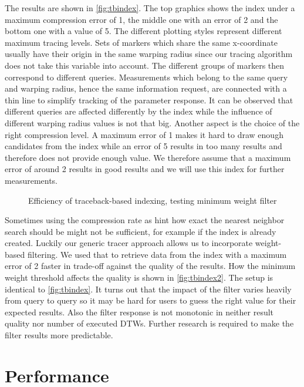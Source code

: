 The results are shown in \autoref{fig:tbindex}. The top graphics shows the index under a maximum compression error of \num{1}, the middle one with an error of \num{2} and the bottom one with a value of \num{5}. The different plotting styles represent different maximum tracing levels. Sets of markers which share the same x-coordinate usually have their origin in the same warping radius since our tracing algorithm does not take this variable into account. The different groups of markers then correspond to different queries. Measurements which belong to the same query and warping radius, hence the same information request, are connected with a thin line to simplify tracking of the parameter response. It can be observed that different queries are affected differently by the index while the influence of different warping radius values is not that big. Another aspect is the choice of the right compression level. A maximum error of \num{1} makes it hard to draw enough candidates from the index while an error of \num{5} results in too many results and therefore does not provide enough value. We therefore assume that a maximum error of around \num{2} results in good results and we will use this index for further measurements.

\begin{figure}
    \centering
    
    \caption{Efficiency of traceback-based indexing, testing minimum weight filter}\label{fig:tbindex2}
\end{figure}

Sometimes using the compression rate as hint how exact the nearest neighbor search should be might not be sufficient, for example if the index is already created. Luckily our generic tracer approach allows us to incorporate weight-based filtering. We used that to retrieve data from the index with a maximum error of \num{2} faster in trade-off against the quality of the results. How the minimum weight threshold affects the quality is shown in \autoref{fig:tbindex2}. The setup is identical to \autoref{fig:tbindex}. It turns out that the impact of the filter varies heavily from query to query so it may be hard for users to guess the right value for their expected results. Also the filter response is not monotonic in neither result quality nor number of executed DTWs. Further research is required to make the filter results more predictable.



\section{Performance}
\label{sec:evaluation:perf}

